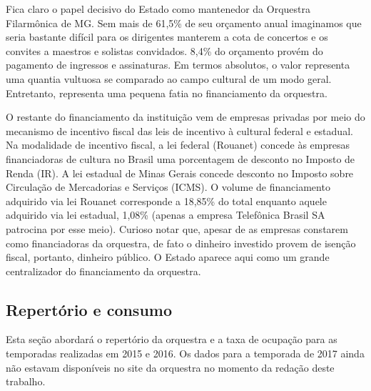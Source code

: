 \documentclass[a4paper, 12pt, openright, oneside, german, french, english, brazil]{abntex2}
\begin{document}
	
	
	Fica claro o papel decisivo do Estado como mantenedor da Orquestra Filarmônica de MG. Sem mais de 61,5\% de seu orçamento anual imaginamos que seria bastante difícil para os dirigentes manterem a cota de concertos e os convites a maestros e solistas convidados. 8,4\% do orçamento provém do pagamento de ingressos e assinaturas. Em termos absolutos, o valor representa uma quantia vultuosa se comparado ao campo cultural de um modo geral. Entretanto, representa uma pequena fatia no financiamento da orquestra.
	
	
	
	O restante do financiamento da instituição vem de empresas privadas por meio do mecanismo de incentivo fiscal das leis de incentivo à cultural federal e estadual. Na modalidade de incentivo fiscal, a lei federal (Rouanet) concede às empresas financiadoras de cultura no Brasil uma porcentagem de desconto no Imposto de Renda (IR). A lei estadual de Minas Gerais concede desconto no Imposto sobre Circulação de Mercadorias e Serviços (ICMS). O volume de financiamento adquirido via lei Rouanet corresponde a 18,85\% do total enquanto aquele adquirido via lei estadual, 1,08\% (apenas a empresa Telefônica Brasil SA patrocina por esse meio). Curioso notar que, apesar de as empresas constarem como financiadoras da orquestra, de fato o dinheiro investido provem de isenção fiscal, portanto, dinheiro público. O Estado aparece aqui como um grande centralizador do financiamento da orquestra.
	
	
	\subsection{Repertório e consumo}
	
	
	Esta seção abordará o repertório da orquestra e a taxa de ocupação para as temporadas realizadas em 2015 e 2016. Os dados para a temporada de 2017 ainda não estavam disponíveis no site da orquestra no momento da redação deste trabalho.
	
\end{document}
